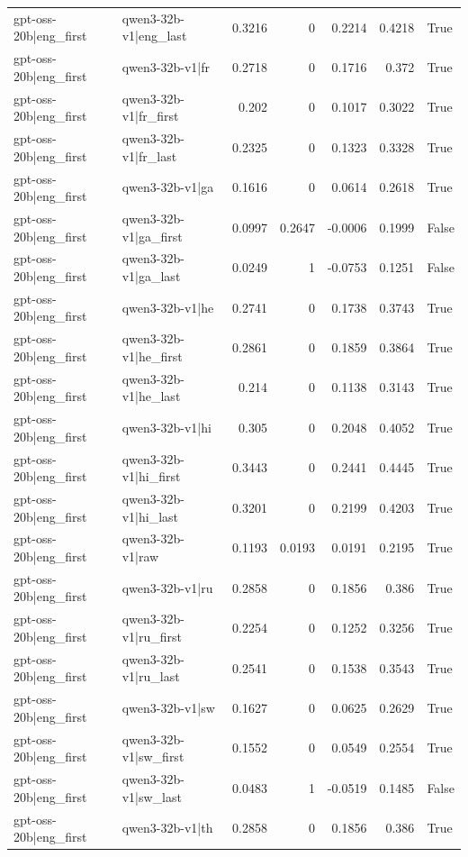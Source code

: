 \begin{table}
\begin{tabular}{l l r r r r l}
gpt-oss-20b|eng_first & qwen3-32b-v1|eng_last & 0.3216 & 0 & 0.2214 & 0.4218 & True \\
gpt-oss-20b|eng_first & qwen3-32b-v1|fr & 0.2718 & 0 & 0.1716 & 0.372 & True \\
gpt-oss-20b|eng_first & qwen3-32b-v1|fr_first & 0.202 & 0 & 0.1017 & 0.3022 & True \\
gpt-oss-20b|eng_first & qwen3-32b-v1|fr_last & 0.2325 & 0 & 0.1323 & 0.3328 & True \\
gpt-oss-20b|eng_first & qwen3-32b-v1|ga & 0.1616 & 0 & 0.0614 & 0.2618 & True \\
gpt-oss-20b|eng_first & qwen3-32b-v1|ga_first & 0.0997 & 0.2647 & -0.0006 & 0.1999 & False \\
gpt-oss-20b|eng_first & qwen3-32b-v1|ga_last & 0.0249 & 1 & -0.0753 & 0.1251 & False \\
gpt-oss-20b|eng_first & qwen3-32b-v1|he & 0.2741 & 0 & 0.1738 & 0.3743 & True \\
gpt-oss-20b|eng_first & qwen3-32b-v1|he_first & 0.2861 & 0 & 0.1859 & 0.3864 & True \\
gpt-oss-20b|eng_first & qwen3-32b-v1|he_last & 0.214 & 0 & 0.1138 & 0.3143 & True \\
gpt-oss-20b|eng_first & qwen3-32b-v1|hi & 0.305 & 0 & 0.2048 & 0.4052 & True \\
gpt-oss-20b|eng_first & qwen3-32b-v1|hi_first & 0.3443 & 0 & 0.2441 & 0.4445 & True \\
gpt-oss-20b|eng_first & qwen3-32b-v1|hi_last & 0.3201 & 0 & 0.2199 & 0.4203 & True \\
gpt-oss-20b|eng_first & qwen3-32b-v1|raw & 0.1193 & 0.0193 & 0.0191 & 0.2195 & True \\
gpt-oss-20b|eng_first & qwen3-32b-v1|ru & 0.2858 & 0 & 0.1856 & 0.386 & True \\
gpt-oss-20b|eng_first & qwen3-32b-v1|ru_first & 0.2254 & 0 & 0.1252 & 0.3256 & True \\
gpt-oss-20b|eng_first & qwen3-32b-v1|ru_last & 0.2541 & 0 & 0.1538 & 0.3543 & True \\
gpt-oss-20b|eng_first & qwen3-32b-v1|sw & 0.1627 & 0 & 0.0625 & 0.2629 & True \\
gpt-oss-20b|eng_first & qwen3-32b-v1|sw_first & 0.1552 & 0 & 0.0549 & 0.2554 & True \\
gpt-oss-20b|eng_first & qwen3-32b-v1|sw_last & 0.0483 & 1 & -0.0519 & 0.1485 & False \\
gpt-oss-20b|eng_first & qwen3-32b-v1|th & 0.2858 & 0 & 0.1856 & 0.386 & True \\

\end{tabular}
\end{table}
